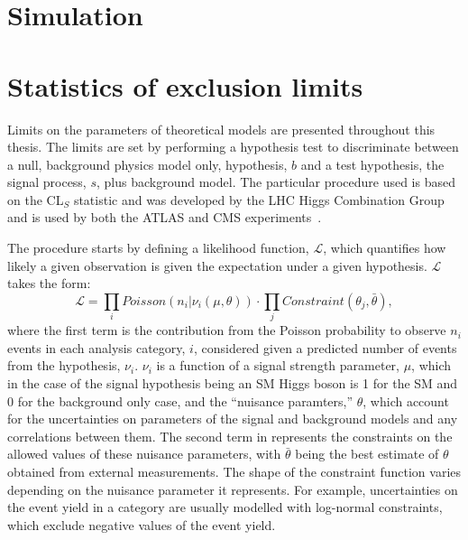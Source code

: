 
\section{Simulation}
\label{sec:sim}
\label{sec:mcweights}

\section{Statistics of exclusion limits}
\label{sec:stats}
Limits on the parameters of theoretical models are presented throughout this thesis. The limits are set by performing a hypothesis test to discriminate between a null, background physics model only, hypothesis, $b$ and a test hypothesis, the signal process, $s$, plus background model. The particular procedure used is based on the CL$_{S}$ statistic and was developed by the LHC Higgs Combination Group and is used by both the ATLAS and CMS experiments~\cite{ATL-PHYS-PUB-2011-011}. 

The procedure starts by defining a likelihood function, $\mathcal{L}$, which quantifies how likely a given observation is given the expectation under a given hypothesis. $\mathcal{L}$ takes the form:
\begin{equation}
  \label{eq:likelihood}
  \mathcal{L}=\displaystyle\prod_{i}Poisson\left(n_{i}|\nu_{i}\left(\mu,\theta\right)\right)\cdot\prod_{j}Constraint\left(\theta_{j},\bar{\theta}\right),
\end{equation}
where the first term is the contribution from the Poisson probability to observe $n_{i}$ events in each analysis category, $i$, considered given a predicted number of events from the hypothesis, $\nu_{i}$. $\nu_{i}$ is a function of a signal strength parameter, $\mu$, which in the case of the signal hypothesis being an SM Higgs boson is 1 for the SM and 0 for the background only case, and the ``nuisance paramters,'' $\theta$, which account for the uncertainties on parameters of the signal and background models and any correlations between them. The second term in  represents the constraints on the allowed values of these nuisance parameters, with $\bar{\theta}$ being the best estimate of $\theta$ obtained from external measurements. The shape of the constraint function varies depending on the nuisance parameter it represents. For example, uncertainties on the event yield in a category are usually modelled with log-normal constraints, which exclude negative values of the event yield. 

